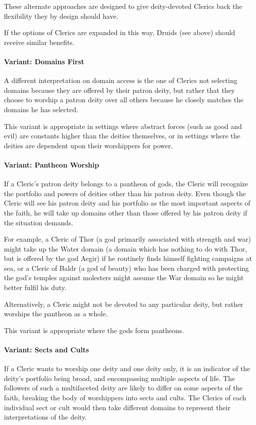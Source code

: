 These alternate approaches are designed to give deity-devoted Clerics back the flexibility they by design should have.

If the options of Clerics are expanded in this way, Druids (see above) should receive similar benefits.
\paragraph{Variant: Domains First}
A different interpretation on domain access is the one of 
Clerics not selecting domains because they are offered by their patron deity, but rather that they choose to worship a patron deity over all others because he closely matches the domains he has selected.

This variant is appropriate in settings where abstract forces (such as good and evil) are constants higher than the deities themselves, or in settings where the deities are dependent upon their worshippers for power.
\paragraph{Variant: Pantheon Worship}
If a Cleric's patron deity belongs to a pantheon of gods, the Cleric will recognize the portfolio and powers of deities other than his patron deity.
Even though the Cleric will see his patron deity and his portfolio as the most important aspects of the faith, he will take up domains other than those offered by his patron deity if the situation demands.

For example, a Cleric of Thor (a god primarily associated with strength and war) might take up the Water domain (a domain which has nothing to do with Thor, but is offered by the god Aegir) if he routinely finds himself fighting campaigns at sea, or a Cleric of Baldr (a god of beauty) who has been charged with protecting the god's temples against molesters might assume the War domain so he might better fulfil his duty.

Alternatively, a Cleric might not be devoted to any particular deity, but rather worships the pantheon as a whole.

This variant is appropriate where the gods form pantheons.
\paragraph{Variant: Sects and Cults}
If a Cleric wants to worship one deity and one deity only, it is an indicator of the deity's portfolio being broad, and encompassing multiple aspects of life. 
The followers of such a multifaceted deity are likely to differ on some aspects of the faith, breaking the body of worshippers into sects and cults. 
The Clerics of each individual sect or cult would then take different domains to represent their interpretations of the deity.

